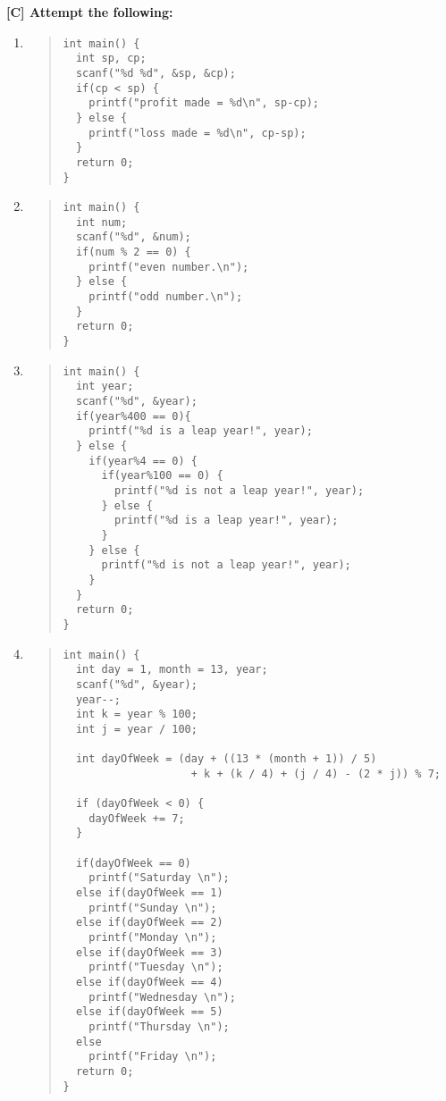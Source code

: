 \documentclass{report}
\begin{document}
\textbf{[C] Attempt the following:}
\begin{enumerate}
    \renewcommand{\labelenumi}{\alph{enumi}}
  \item \begin{quote} \begin{verbatim}
int main() {
  int sp, cp;
  scanf("%d %d", &sp, &cp);
  if(cp < sp) {
    printf("profit made = %d\n", sp-cp);
  } else {
    printf("loss made = %d\n", cp-sp);
  }
  return 0;
}
  \end{verbatim} \end{quote} 

  \item \begin{quote} \begin{verbatim}
int main() {
  int num;
  scanf("%d", &num);
  if(num % 2 == 0) {
    printf("even number.\n");
  } else {
    printf("odd number.\n");
  }
  return 0;
}
  \end{verbatim} \end{quote} 

  \item \begin{quote} \begin{verbatim}
int main() {
  int year;
  scanf("%d", &year);
  if(year%400 == 0){
    printf("%d is a leap year!", year);
  } else {
    if(year%4 == 0) {
      if(year%100 == 0) {
        printf("%d is not a leap year!", year);
      } else {
        printf("%d is a leap year!", year);
      }
    } else {
      printf("%d is not a leap year!", year);
    }
  }
  return 0;
}
  \end{verbatim} \end{quote} 

  \item \begin{quote} \begin{verbatim}
int main() {
  int day = 1, month = 13, year;
  scanf("%d", &year);
  year--;
  int k = year % 100;
  int j = year / 100;

  int dayOfWeek = (day + ((13 * (month + 1)) / 5) 
                    + k + (k / 4) + (j / 4) - (2 * j)) % 7;

  if (dayOfWeek < 0) {
    dayOfWeek += 7;
  }

  if(dayOfWeek == 0)
    printf("Saturday \n");
  else if(dayOfWeek == 1)
    printf("Sunday \n");
  else if(dayOfWeek == 2)
    printf("Monday \n");
  else if(dayOfWeek == 3)
    printf("Tuesday \n");
  else if(dayOfWeek == 4)
    printf("Wednesday \n");
  else if(dayOfWeek == 5)
    printf("Thursday \n");
  else
    printf("Friday \n");
  return 0;
}
  \end{verbatim} \end{quote} 


\end{enumerate}
\end{document}
